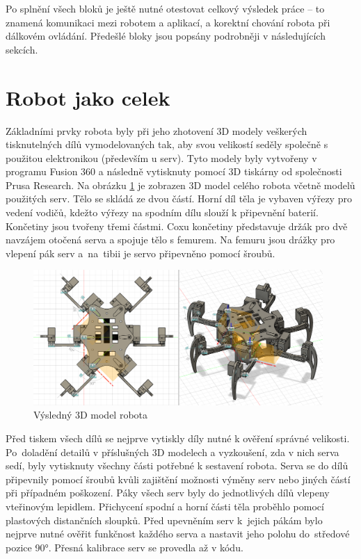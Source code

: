Po splnění všech bloků je ještě nutné otestovat celkový výsledek práce -- to znamená komunikaci mezi robotem a aplikací, a korektní chování robota při dálkovém ovládání. Předešlé bloky jsou popsány podrobněji v následujících sekcích.

\section{Robot jako celek}
Základními prvky robota byly při jeho zhotovení 3D modely veškerých tisknutelných dílů vymodelovaných tak, aby svou velikostí seděly společně s použitou elektronikou (především u serv). Tyto modely byly vytvořeny v programu Fusion 360 a následně vytisknuty pomocí 3D tiskárny od společnosti Prusa Research. Na obrázku \ref{3dmodel} je zobrazen 3D model celého robota včetně modelů použitých serv. Tělo se skládá ze dvou částí. Horní díl těla je vybaven výřezy pro vedení vodičů, kdežto výřezy na spodním dílu slouží k připevnění baterií. Končetiny jsou tvořeny třemi částmi. Coxu končetiny představuje držák pro dvě navzájem otočená serva a spojuje tělo s femurem. Na femuru jsou drážky pro vlepení pák serv a~na~tibii je servo připevněno pomocí šroubů.

\begin{figure}[hbt]
	\centering
	\includegraphics[width=0.98\textwidth]{obrazky-figures/3dmodel.png}
	\caption{Výsledný 3D model robota}
    \label{3dmodel}
\end{figure}

\pagebreak

Před tiskem všech dílů se nejprve vytiskly díly nutné k ověření správné velikosti. Po~doladění detailů v příslušných 3D modelech a vyzkoušení, zda v nich serva sedí, byly vytisknuty všechny části potřebné k sestavení robota. Serva se do dílů připevnily pomocí šroubů kvůli zajištění možnosti výměny serv nebo jiných částí při případném poškození. Páky všech serv byly do jednotlivých dílů vlepeny vteřinovým lepidlem. Přichycení spodní a horní části těla proběhlo pomocí plastových distančních sloupků. Před upevněním serv k~jejich pákám bylo nejprve nutné ověřit funkčnost každého serva a nastavit jeho polohu do~středové pozice 90°. Přesná kalibrace serv se provedla až v kódu.



